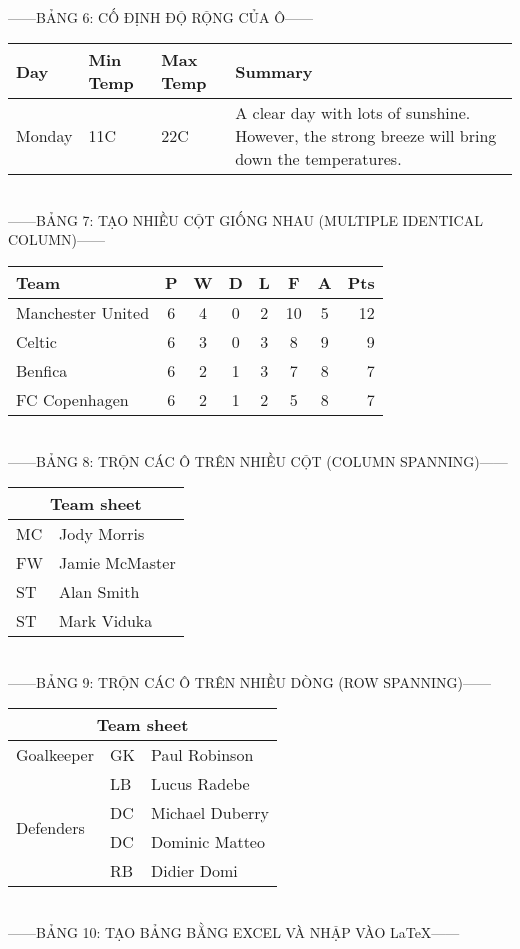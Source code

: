 \documentclass{report}
\begin{document}
\hfill\\[5cm]
------BẢNG 6: CỐ ĐỊNH ĐỘ RỘNG CỦA Ô------\\[0.3cm]
\begin{center}
    \begin{tabular}[b]{ | l | l | l | p{5cm} |} %
    \hline
    Day & Min Temp & Max Temp & Summary \\ \hline
    Monday & 11C & 22C & A clear day with lots of sunshine.  
    However, the strong breeze will bring down the temperatures. \\ \hline
    \end{tabular}
\end{center}

\hfill\\[0.5cm]
------BẢNG 7: TẠO NHIỀU CỘT GIỐNG NHAU (MULTIPLE IDENTICAL COLUMN)------\\[0.3cm]
\begin{tabular}{l*{6}{c}r}
Team              & P & W & D & L & F  & A & Pts \\
\hline
Manchester United & 6 & 4 & 0 & 2 & 10 & 5 & 12  \\
Celtic            & 6 & 3 & 0 & 3 &  8 & 9 &  9  \\
Benfica           & 6 & 2 & 1 & 3 &  7 & 8 &  7  \\
FC Copenhagen     & 6 & 2 & 1 & 2 &  5 & 8 &  7  \\
\end{tabular}

\hfill\\[0.5cm]
------BẢNG 8: TRỘN CÁC Ô TRÊN NHIỀU CỘT (COLUMN SPANNING)------\\[0.3cm]
\begin{tabular}{|l|l|}
  \hline
  \multicolumn{2}{|c|}{Team sheet} \\
  \hline
  MC & Jody Morris \\
  FW & Jamie McMaster \\
  ST & Alan Smith \\
  ST & Mark Viduka \\
  \hline
\end{tabular}

\hfill\\[0.5cm]
------BẢNG 9: TRỘN CÁC Ô TRÊN NHIỀU DÒNG (ROW SPANNING)------\\[0.3cm]
\begin{tabular}{|l|l|l|}
\hline
\multicolumn{3}{|c|}{Team sheet} \\
\hline
Goalkeeper & GK & Paul Robinson \\ \hline
\multirow{4}{*}{Defenders} & LB & Lucus Radebe \\
 & DC & Michael Duberry \\
 & DC & Dominic Matteo \\
 & RB & Didier Domi \\ \hline
\end{tabular}

\hfill\\[0.5cm]
------BẢNG 10: TẠO BẢNG BẰNG EXCEL VÀ NHẬP VÀO \LaTeX------\\[0.3cm]



\end{document}
